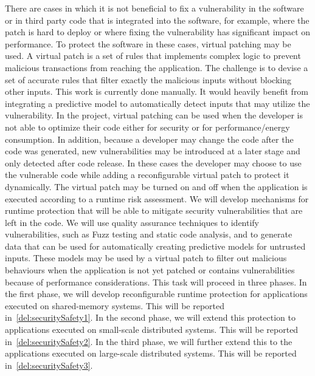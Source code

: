 \begin{Workpackage}{\thewpno}
\begin{Task}
\TaskResults{
\ref{del:securitySafety1}
\ref{del:securitySafety2}
\ref{del:securitySafety3}
%
}
\TaskHeader{}
There are cases in which it is not beneficial to fix a vulnerability in
the software or in third party code that is integrated into the software, for
example, where the patch is hard to deploy or where fixing the
vulnerability has significant impact on performance. To protect the
software in these cases, virtual patching may be used. A virtual patch is
a set of rules that implements complex logic to prevent malicious
transactions from reaching the application. The challenge is to devise
a set of accurate rules that filter exactly the malicious inputs
without blocking other inputs. This work is currently done manually.
It would heavily benefit from integrating a predictive model to
automatically detect inputs that may utilize the vulnerability.  %
In
the \TheProject project, virtual patching can be used when the
developer is not able to optimize their code either for security or for
performance/energy consumption. In addition, because a developer may
change the code after the code was generated, new vulnerabilities may be introduced
at a later stage and only detected after code release. In these
cases the developer may choose to use the vulnerable code while adding a
reconfigurable virtual patch to protect it dynamically. The virtual patch
may be turned on and off when the application is executed according to a runtime
risk assessment.  We will develop mechanisms for runtime protection
that will be able to mitigate security vulnerabilities
that are left in the code. We will use quality assurance techniques to
identify vulnerabilities, such as Fuzz testing and static code
analysis, and to generate data that can be used for automatically creating
predictive models for untrusted inputs. These models may be used by a
virtual patch to filter out malicious behaviours when the application is
not yet patched or contains vulnerabilities because of performance
considerations. This task will proceed in three phases. In the first phase, we
will develop reconfigurable runtime protection for applications executed on shared-memory
systems. This will be reported in~\ref{del:securitySafety1}. In the second phase, we will extend this protection to applications executed on small-scale distributed systems. This will be reported in~\ref{del:securitySafety2}. In the third phase, we will further extend this to the applications executed on large-scale distributed systems. This will be reported in~\ref{del:securitySafety3}.
\end{Task}



\end{Workpackage}

